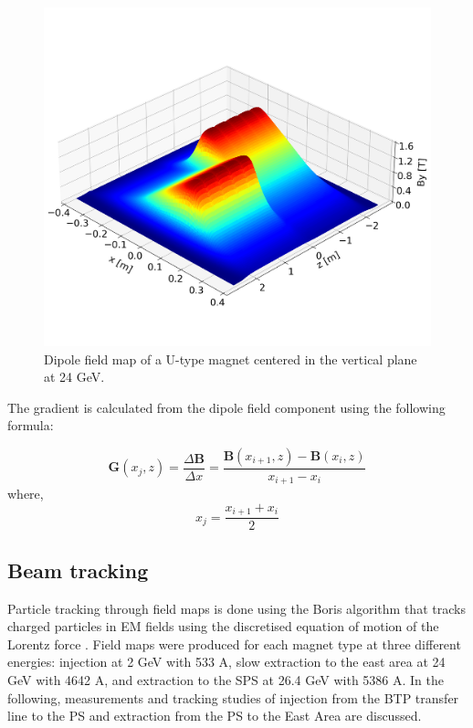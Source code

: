 \documentclass[a4paper,
               biblatex,     %
               keeplastbox,   %
               ]{jacow}
\begin{document}
\begin{figure}[!htb]
   \centering
   \includegraphics*[width=1.0\columnwidth, trim={0 2.9cm 0 4.3cm},clip]{MOPOTK030_f3.png}
   \caption{Dipole field map of a U-type magnet centered in the vertical plane at 24 GeV.}
   \label{fig:dipole_field}
\end{figure}

The gradient is calculated from the dipole field component using the following formula:
 
$$ \boldsymbol{G}(x_{j},z) = \frac{\Delta\boldsymbol{B}}{\Delta x} = \frac{\boldsymbol{B}(x_{i+1},z) - \boldsymbol{B}(x_{i},z)}{x_{i+1}-x_{i}} $$
where,
$$ x_{j} = \frac{x_{i+1} + x_{i}}{{2}} $$

\subsection{Beam tracking}

Particle tracking through field maps is done using the Boris algorithm that tracks charged particles in EM fields using the discretised equation of motion of the Lorentz force \cite{dutheil_pybttrackersborispy_nodate,qin_why_2013,ripperda_comprehensive_2018}. Field maps were produced for each magnet type at three different energies: injection at 2 GeV with 533 A, slow extraction to the east area at 24 GeV with 4642 A, and extraction to the SPS at 26.4 GeV with 5386 A. In the following, measurements and tracking studies of injection from the BTP transfer line to the PS and extraction from the PS to the East Area are discussed.
\end{document}
